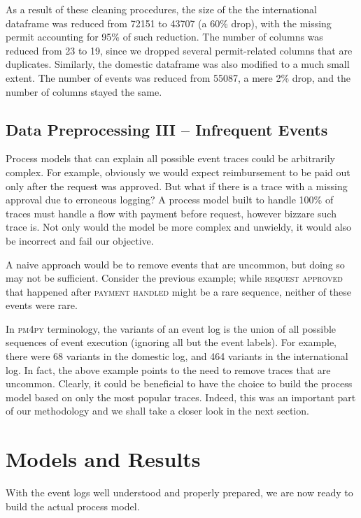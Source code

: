 \documentclass[conference]{IEEEtran}
\begin{document}
As a result of these cleaning procedures, the size of the
the international dataframe was reduced from 72151 to 43707 (a 60\% drop),
with the
missing permit accounting for 95\% of such reduction. The number of
columns was reduced from 23 to 19, since we dropped
several permit-related columns that are duplicates.
Similarly, the domestic dataframe was also modified to a much small extent.
The number of events was reduced from 55087, a mere 2\% drop, and the
number of columns stayed the same.

\subsection{Data Preprocessing III -- Infrequent Events}

Process models that can explain all possible event traces could be
arbitrarily complex. For example, obviously we would expect reimbursement to
be paid out only after the request was approved. But what if there is
a trace with a missing approval due to erroneous logging? A process model
built to handle 100\% of traces must handle a flow with
payment before request, however bizzare such trace is.
Not only would the model be more complex and unwieldy,
it would also be incorrect and fail our objective.

A naive approach would be to remove events that are uncommon, but doing so may
not be sufficient. Consider the previous example;
while \textsc{request approved} that happened after \textsc{payment handled}
might be a rare sequence, neither of these events were rare.

In \textsc{pm4py} terminology, the variants of an event log is the
union of all possible sequences of event execution (ignoring all but the
event labels). For example, there were
68 variants in the domestic log, and 464 variants in the international log.
In fact, the above example
points to the need to remove traces that are uncommon. Clearly, it could
be beneficial to have the choice to build the process model based on
only the most popular traces. Indeed, this was an important part of our
methodology and we shall take a closer look in the next section.

\section{Models and Results}
\label{section-models}


With the event logs well understood and properly prepared, we are now
ready to build the actual process model.
\end{document}
